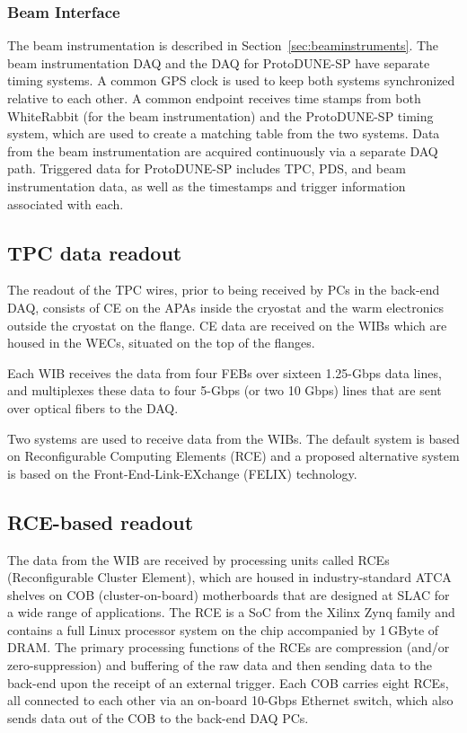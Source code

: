 \subsubsection{Beam Interface}

The beam instrumentation is described in Section~\ref{sec:beaminstruments}.
The beam instrumentation DAQ and the DAQ for ProtoDUNE-SP
have separate timing systems.  A common GPS clock is used to keep both
systems synchronized relative to each other.  A common endpoint receives time stamps 
from both WhiteRabbit (for the beam instrumentation) and the ProtoDUNE-SP timing system, which 
are used to create a matching table from the two systems.  
Data from the beam
instrumentation are acquired continuously via a separate DAQ path.  Triggered
data for ProtoDUNE-SP includes TPC, PDS, and beam instrumentation data, as well as
the timestamps and trigger information associated with each. 

\subsection{TPC data readout}

The readout of the TPC wires, prior to being received by PCs in
the back-end DAQ, consists of  CE on the APAs
inside the cryostat and the warm electronics outside
the cryostat on the flange.  CE data are received on the WIBs
which are housed in the WECs, situated on the top of the flanges.

Each WIB receives the
data from four FEBs over sixteen 1.25-Gbps data lines, and multiplexes
these data to four 5-Gbps (or two 10 Gbps) lines that are sent over
optical fibers to the DAQ.

Two systems are used to receive data from the WIBs.  The default system
 is based on Reconfigurable Computing Elements (RCE) and a proposed alternative system is based on
the Front-End-Link-EXchange (FELIX) technology. 

\subsection{RCE-based readout}
The data from the WIB are received by processing units called RCEs (Reconfigurable Cluster Element), 
\cite{slac:rce}
which are housed in industry-standard
ATCA shelves on COB (cluster-on-board) motherboards that are designed
at SLAC for a wide range of applications.   The RCE is a SoC 
from the
Xilinx Zynq family and contains a full Linux processor system on the chip
accompanied by 1\,GByte of DRAM.   The primary processing functions of the
RCEs are compression (and/or zero-suppression) and buffering
of the raw data and then sending data to the back-end upon the receipt of
an external trigger.  Each COB carries eight RCEs, all connected to each
other via an on-board 10-Gbps Ethernet switch, which also sends data out
of the COB to the back-end DAQ PCs.


